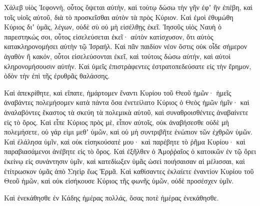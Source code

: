 {Χάλεβ υἱὸς Ἰεφοννὴ, οὗτος ὄψεται αὐτὴν, καὶ τούτῳ δώσω τὴν γῆν ἐφʼ ἣν ἐπέβη, καὶ τοῖς υἱοῖς αὐτοῦ, διὰ τὸ προσκεῖσθαι αὐτὸν τὰ πρὸς Κύριον.
Καὶ ἐμοὶ ἐθυμώθη Κύριος διʼ ὑμᾶς, λέγων, οὐδὲ σὺ οὐ μὴ εἰσέλθῃς ἐκεῖ.
Ἰησοῦς υἱὸς Ναυὴ ὁ παρεστηκώς σοι, οὗτος εἰσελεύσεται ἐκεῖ· αὐτὸν κατίσχυσον, ὅτι αὐτὸς κατακληρονομήσει αὐτὴν τῷ Ἰσραήλ.
Καὶ πᾶν παιδίον νέον ὅστις οὐκ οἶδε σήμερον ἀγαθὸν ἢ κακόν, οὗτοι εἰσελεύσονται ἐκεῖ, καὶ τούτοις δώσω αὐτήν, καὶ αὐτοὶ κληρονομήσουσιν αὐτήν.
Καὶ ὑμεῖς ἐπιστράφεντες ἐστρατοπεδεύσατε εἰς τὴν ἔρημον, ὁδὸν τὴν ἐπὶ τῆς ἐρυθρᾶς θαλάσσης.
\par }{\PP {}Καὶ ἀπεκρίθητε, καὶ εἴπατε, ἡμάρτομεν ἔναντι Κυρίου τοῦ Θεοῦ ἡμῶν· ἡμεῖς ἀναβάντες πολεμήσομεν κατὰ πάντα ὅσα ἐνετείλατο Κύριος ὁ Θεὸς ἡμῶν ἡμῖν· καὶ ἀναλαβόντες ἕκαστος τὰ σκεύη τὰ πολεμικὰ αὐτοῦ, καὶ συναθροισθέντες ἀναβαίνετε εἰς τὸ ὄρος.
Καὶ εἶπε Κύριος πρὸς μὲ, εἶπον αὐτοῖς, οὐκ ἀναβήσεσθε οὐδὲ μὴ πολεμήσετε, οὐ γάρ εἰμι μεθʼ ὑμῶν, καὶ οὐ μὴ συντριβῆτε ἐνώπιον τῶν ἐχθρῶν ὑμῶν.
Καὶ ἐλάλησα ὑμῖν, καὶ οὐκ εἰσηκούσατέ μου· καὶ παρέβητε τὸ ῥῆμα Κυρίου· καὶ παραβιασάμενοι ἀνέβητε εἰς τὸ ὄρος.
Καὶ ἐξῆλθεν ὁ Ἀμοῤῥαῖος ὁ κατοικῶν ἐν τῷ ὄρει ἐκείνῳ εἰς συνάντησιν ὑμῖν, καὶ κατεδίωξεν ὑμᾶς ὡσεὶ ποιήσαισαν αἱ μέλισσαι, καὶ ἐτίτρωσκον ὑμᾶς ἀπὸ Σηεὶρ ἕως Ἑρμᾶ.
Καὶ καθίσαντες ἐκλαίετε ἐναντίον Κυρίου τοῦ Θεοῦ ἡμῶν, καὶ οὐκ εἰσήκουσε Κύριος τῆς φωνῆς ὑμῶν, οὐδὲ προσέσχεν ὑμῖν.
\par }{\PP {}Καὶ ἐνεκάθησθε ἐν Κάδης ἡμέρας πολλάς, ὅσας ποτὲ ἡμέρας ἐνεκάθησθε.

}
